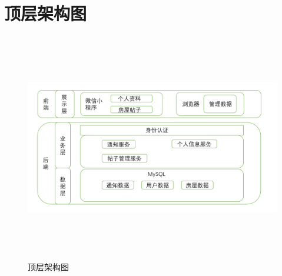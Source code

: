 
\chapter{顶层架构图}

\begin{figure}[htbp]

    \centering
    
    \includegraphics[height=10.0cm,width=14.0cm]{requirement/figures/dingcengjiagou.png}%
    
    \caption{顶层架构图}
    
    \end{figure}